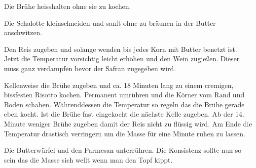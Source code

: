 \vspace*{\fill}
\begin{multicols}{2}

Die Brühe heisshalten ohne sie zu kochen.

Die Schalotte kleinschneiden und sanft ohne zu bräunen 
in der Butter anschwitzen.\newline

Den Reis zugeben und solange wenden bis jedes Korn mit Butter
benetzt ist.
Jetzt die Temperatur vorsichtig leicht erhöhen und den Wein
zugießen. Dieser muss ganz verdampfen bevor der Safran zugegeben wird.\newline

Kellenweise die Brühe zugeben und ca. 18 Minuten lang zu einem
cremigen, bissfesten Risotto kochen.
Permanent umrühren und  die Körner vom Rand und Boden schaben.
Währenddessen die Temperatur so regeln das die Brühe gerade eben kocht.
Ist die Brühe fast eingekocht die nächste Kelle zugeben.\newline
Ab der 14. Minute weniger Brühe zugeben damit der Reis nicht zu
flüssig wird.\newline
Am Ende die Temperatur drastisch verringern um die Masse für eine
Minute ruhen zu lassen.\newline

Die Butterwürfel und den Parmesan unterrühren.
Die Konsistenz sollte nun so sein das die Masse sich wellt
wenn man den Topf kippt.


\end{multicols}
\vfill
